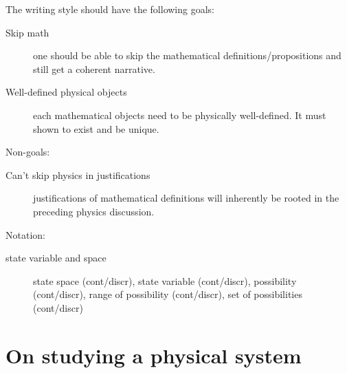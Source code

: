 \documentclass[aps,pra,10pt,twocolumn,floatfix,nofootinbib]{revtex4-1}
\theoremstyle{definition}
\begin{document}
The writing style should have the following goals:
\begin{description}
  \item[Skip math] one should be able to skip the mathematical definitions/propositions and still get a coherent narrative.
  \item[Well-defined physical objects] each mathematical objects need to be physically well-defined. It must shown to exist and be unique.
\end{description}
Non-goals:
\begin{description}
  \item[Can't skip physics in justifications] justifications of mathematical definitions will inherently be rooted in the preceding physics discussion.
\end{description}
Notation:
\begin{description}
  \item[state variable and space] state space (cont/discr), state variable (cont/discr), possibility (cont/discr), range of possibility (cont/discr), set of possibilities (cont/discr)
\end{description}

\section{On studying a physical system}


\end{document}
